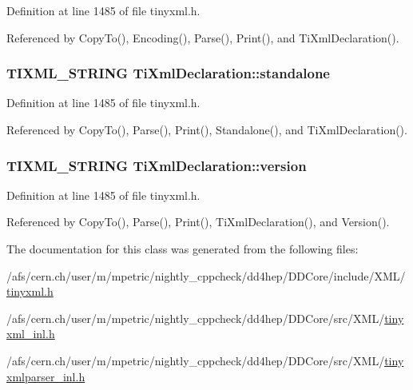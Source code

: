 Definition at line 1485 of file tinyxml.h.

Referenced by CopyTo(), Encoding(), Parse(), Print(), and TiXmlDeclaration().\hypertarget{class_ti_xml_declaration_a52524bf1a0726104350fe4121d7fdff4}{
\subsubsection[{standalone}]{\setlength{\rightskip}{0pt plus 5cm}TIXML\_\-STRING {\bf TiXmlDeclaration::standalone}}}
\label{class_ti_xml_declaration_a52524bf1a0726104350fe4121d7fdff4}


Definition at line 1485 of file tinyxml.h.

Referenced by CopyTo(), Parse(), Print(), Standalone(), and TiXmlDeclaration().\hypertarget{class_ti_xml_declaration_ab9eb14dc9cb78e3a8a0636d5d6a5d04d}{
\subsubsection[{version}]{\setlength{\rightskip}{0pt plus 5cm}TIXML\_\-STRING {\bf TiXmlDeclaration::version}}}
\label{class_ti_xml_declaration_ab9eb14dc9cb78e3a8a0636d5d6a5d04d}


Definition at line 1485 of file tinyxml.h.

Referenced by CopyTo(), Parse(), Print(), TiXmlDeclaration(), and Version().

The documentation for this class was generated from the following files:\begin{DoxyCompactItemize}
\item 
/afs/cern.ch/user/m/mpetric/nightly\_\-cppcheck/dd4hep/DDCore/include/XML/\hyperlink{tinyxml_8h}{tinyxml.h}\item 
/afs/cern.ch/user/m/mpetric/nightly\_\-cppcheck/dd4hep/DDCore/src/XML/\hyperlink{tinyxml__inl_8h}{tinyxml\_\-inl.h}\item 
/afs/cern.ch/user/m/mpetric/nightly\_\-cppcheck/dd4hep/DDCore/src/XML/\hyperlink{tinyxmlparser__inl_8h}{tinyxmlparser\_\-inl.h}\end{DoxyCompactItemize}
